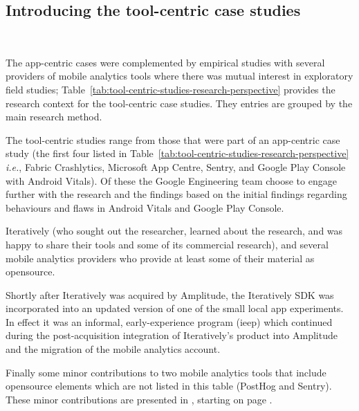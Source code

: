 \subsection{Introducing the tool-centric case studies}~\label{methodology-introducing-the-tool-centric-case-studies-section}

The app-centric cases were complemented by empirical studies with several providers of mobile analytics tools where there was mutual interest in exploratory field studies; Table~\ref{tab:tool-centric-studies-research-perspective} provides the research context for the tool-centric case studies. They entries are grouped by the main research method.

The tool-centric studies range from those that were part of an app-centric case study (the first four listed in Table~\ref{tab:tool-centric-studies-research-perspective} \textit{i.e.}, Fabric Crashlytics, Microsoft App Centre, Sentry, and Google Play Console with Android Vitals). Of these the Google Engineering team choose to engage further with the research and the findings based on the initial findings regarding behaviours and flaws in Android Vitals and Google Play Console.

Iteratively (who sought out the researcher, learned about the research, and was happy to share their tools and some of its commercial research), and several mobile analytics providers who provide at least some of their material as opensource. 

Shortly after Iteratively was acquired by Amplitude, the Iteratively SDK was incorporated into an updated version of one of the small local app experiments. In effect it was an informal, early-experience program (\acrshort{ieep}) which continued during the post-acquisition integration of Iteratively's product into Amplitude and the migration of the mobile analytics account.

Finally some minor contributions to two mobile analytics tools that include opensource elements which are not listed in this table (PostHog and Sentry). These minor contributions are presented in , starting on page \pageref{section-contributions-to-opensource-mobile-analytics-projects}.


